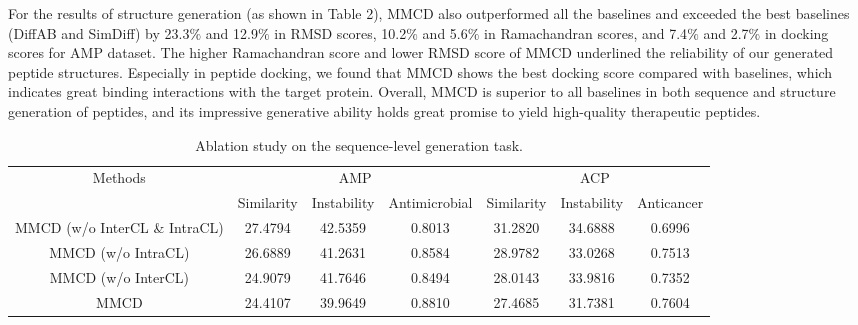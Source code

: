 \documentclass[letterpaper]{article} %
\begin{document}
For the results of structure generation (as shown in Table 2), MMCD also outperformed all the baselines and exceeded the best baselines (DiffAB and SimDiff) by 23.3$\%$ and 12.9$\%$ in RMSD scores, 10.2$\%$ and 5.6$\%$ in Ramachandran scores, and 7.4$\%$ and 2.7$\%$ in docking scores for AMP dataset. The higher Ramachandran score and lower RMSD score of MMCD underlined the reliability of our generated peptide structures. Especially in peptide docking, we found that MMCD shows the best docking score compared with baselines, which indicates great binding interactions with the target protein. Overall, MMCD is superior to all baselines in both sequence and structure generation of peptides, and its impressive generative ability holds great promise to yield high-quality therapeutic peptides.

\begin{table}[ht]
\centering
\setlength{\tabcolsep}{6pt}
\begin{tabular}{ccccccc}
\hline
\multirow{2}{*}{Methods} & \multicolumn{3}{c}{AMP}                     & \multicolumn{3}{c}{ACP}                  \\ \cmidrule(r){2-4} \cmidrule(r){5-7}
                         & Similarity & Instability & Antimicrobial & Similarity & Instability & Anticancer \\ \hline
MMCD (w/o InterCL \& IntraCL)  & 27.4794     & 42.5359      & 0.8013         & 31.2820     & 34.6888      & 0.6996      \\
MMCD (w/o IntraCL)             & 26.6889     & 41.2631      & 0.8584         & 28.9782     & 33.0268      & 0.7513      \\
MMCD (w/o InterCL)             & 24.9079     & 41.7646      & 0.8494         & 28.0143     & 33.9816      & 0.7352      \\
MMCD                           & 24.4107     & 39.9649      & 0.8810         & 27.4685     & 31.7381      & 0.7604      \\ \hline
\end{tabular}
\caption{Ablation study on the sequence-level generation task.} 
\end{table}
\end{document}
